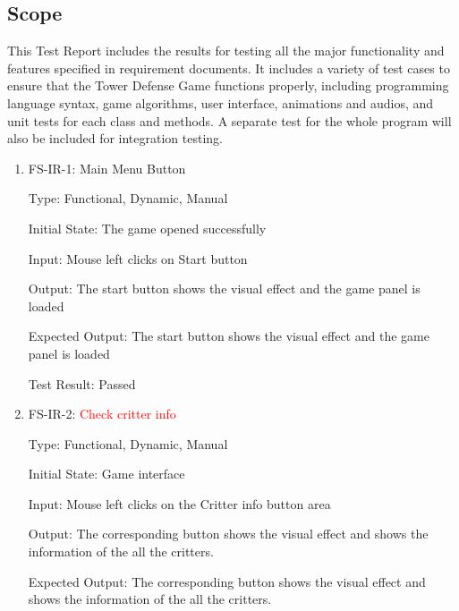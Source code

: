 \documentclass[12pt]{article}
\begin{document}
	\subsection{Scope}
	This Test Report includes the results for testing all the major functionality and features specified in requirement documents. It includes a variety of test cases to ensure that the Tower Defense Game functions properly, including programming language syntax, game algorithms, user interface, animations and audios, and unit tests for each class and methods. A separate test for the whole program will also be included for integration testing.
	


\newpage	


\begin{enumerate}

\section{Functional Requirements Evaluation}

\subsection{User Input and the Response}
					
    \item{FS-IR-1: Main Menu Button}
    
    Type: Functional, Dynamic, Manual
					
	Initial State: The game opened successfully
					
	Input: Mouse left clicks on Start button
					
	Output: The start button shows the visual effect and the game panel is loaded

	Expected Output: The start button shows the visual effect and the game panel is loaded
	
	Test Result: Passed
	
	
	\item{FS-IR-2: \textcolor{red}{Check critter info}}
	
	Type: Functional, Dynamic, Manual
	
	Initial State: Game interface

	Input: Mouse left clicks on the Critter info button area

	Output: The corresponding button shows the visual effect and shows the information of the all the critters.

	Expected Output: The corresponding button shows the visual effect and shows the information of the all the critters.
	

\end{enumerate}
\end{document}
